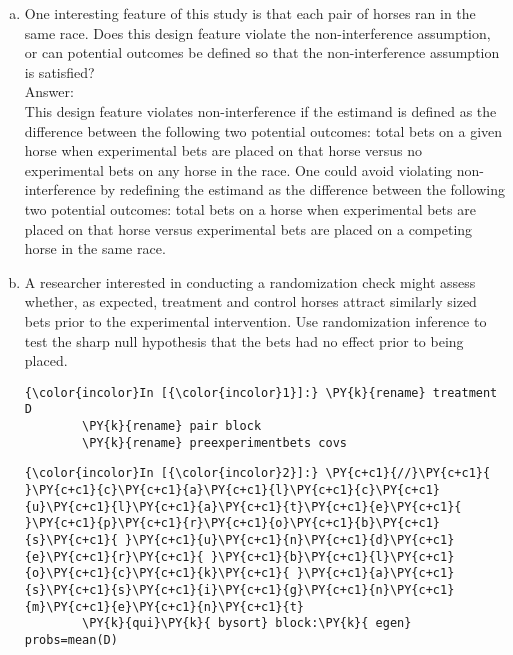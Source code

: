 \documentclass[11pt,notitlepage]{article}\usepackage[]{graphicx}\usepackage[]{color}
\makeatletter
\newenvironment{kframe}{%
 \def\at@end@of@kframe{}%
 \ifinner\ifhmode%
  \def\at@end@of@kframe{\end{minipage}}%
  \begin{minipage}{\columnwidth}%
 \fi\fi%
 \def\FrameCommand##1{\hskip\@totalleftmargin \hskip-\fboxsep
 \colorbox{shadecolor}{##1}\hskip-\fboxsep
     \hskip-\linewidth \hskip-\@totalleftmargin \hskip\columnwidth}%
 \MakeFramed {\advance\hsize-\width
   \@totalleftmargin\z@ \linewidth\hsize
   \@setminipage}}%
 {\par\unskip\endMakeFramed%
 \at@end@of@kframe}
\newenvironment{knitrout}{}{} %
\makeatother
\begin{document}
\begin{enumerate}[a)]
\item One interesting feature of this study is that each pair of horses ran in the same race.  Does this design feature violate the non-interference assumption, or can potential outcomes be defined so that the non-interference assumption is satisfied? \\
Answer:\\
This design feature violates non-interference if the estimand is defined as the difference between the following two potential outcomes: total bets on a given horse when experimental bets are placed on that horse versus no experimental bets on any horse in the race.  One could avoid violating non-interference by redefining the estimand as the difference between the following two potential outcomes: total bets on a horse when experimental bets are placed on that horse versus experimental bets are placed on a competing horse in the same race. 

\item A researcher interested in conducting a randomization check might assess whether, as expected, treatment and control horses attract similarly sized bets prior to the experimental intervention.  Use randomization inference to test the sharp null hypothesis that the bets had no effect prior to being placed. \\

\begin{knitrout}
\color{fgcolor}\begin{kframe}
    \begin{Verbatim}[commandchars=\\\{\}]
{\color{incolor}In [{\color{incolor}1}]:} \PY{k}{rename} treatment D
        \PY{k}{rename} pair block
        \PY{k}{rename} preexperimentbets covs
\end{Verbatim}

    \begin{Verbatim}[commandchars=\\\{\}]
{\color{incolor}In [{\color{incolor}2}]:} \PY{c+c1}{//}\PY{c+c1}{ }\PY{c+c1}{c}\PY{c+c1}{a}\PY{c+c1}{l}\PY{c+c1}{c}\PY{c+c1}{u}\PY{c+c1}{l}\PY{c+c1}{a}\PY{c+c1}{t}\PY{c+c1}{e}\PY{c+c1}{ }\PY{c+c1}{p}\PY{c+c1}{r}\PY{c+c1}{o}\PY{c+c1}{b}\PY{c+c1}{s}\PY{c+c1}{ }\PY{c+c1}{u}\PY{c+c1}{n}\PY{c+c1}{d}\PY{c+c1}{e}\PY{c+c1}{r}\PY{c+c1}{ }\PY{c+c1}{b}\PY{c+c1}{l}\PY{c+c1}{o}\PY{c+c1}{c}\PY{c+c1}{k}\PY{c+c1}{ }\PY{c+c1}{a}\PY{c+c1}{s}\PY{c+c1}{s}\PY{c+c1}{i}\PY{c+c1}{g}\PY{c+c1}{n}\PY{c+c1}{m}\PY{c+c1}{e}\PY{c+c1}{n}\PY{c+c1}{t}
        \PY{k}{qui}\PY{k}{ bysort} block:\PY{k}{ egen} probs=mean(D)
        

\end{Verbatim}
\end{kframe}
\end{knitrout}
\end{enumerate}
\end{document}
